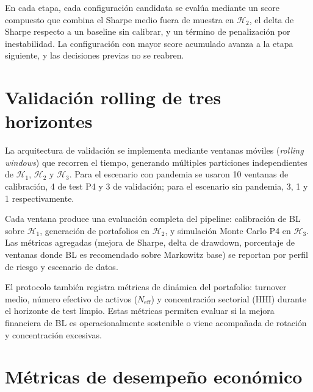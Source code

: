En cada etapa, cada configuraci\'on candidata se eval\'ua mediante un score
compuesto que combina el Sharpe medio fuera de muestra en $\mathcal{H}_2$, el
delta de Sharpe respecto a un baseline sin calibrar, y un t\'ermino de
penalizaci\'on por inestabilidad. La configuraci\'on con mayor score acumulado
avanza a la etapa siguiente, y las decisiones previas no se reabren.

\section{Validaci\'on rolling de tres horizontes}

La arquitectura de validaci\'on se implementa mediante ventanas m\'oviles
(\textit{rolling windows}) que recorren el tiempo, generando m\'ultiples
particiones independientes de $\mathcal{H}_1$, $\mathcal{H}_2$ y
$\mathcal{H}_3$. Para el escenario con pandemia se usaron 10 ventanas de
calibraci\'on, 4 de test P4 y 3 de validaci\'on; para el escenario sin
pandemia, 3, 1 y 1 respectivamente.

Cada ventana produce una evaluaci\'on completa del pipeline: calibraci\'on de
BL sobre $\mathcal{H}_1$, generaci\'on de portafolios en $\mathcal{H}_2$, y
simulaci\'on Monte Carlo P4 en $\mathcal{H}_3$. Las m\'etricas agregadas
(mejora de Sharpe, delta de drawdown, porcentaje de ventanas donde BL es
recomendado sobre Markowitz base) se reportan por perfil de riesgo y escenario
de datos.

El protocolo tambi\'en registra m\'etricas de din\'amica del portafolio:
turnover medio, n\'umero efectivo de activos ($N_{\text{eff}}$) y concentraci\'on
sectorial (HHI) durante el horizonte de test limpio. Estas m\'etricas
permiten evaluar si la mejora financiera de BL es operacionalmente sostenible
o viene acompa\~nada de rotaci\'on y concentraci\'on excesivas.

\section{M\'etricas de desempe\~no econ\'omico}

